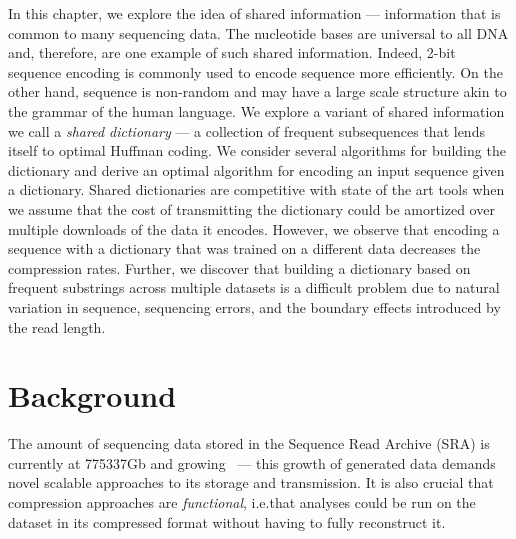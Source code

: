 \documentclass[12pt]{cmuthesis}
\begin{document}
In this chapter, we explore the idea of shared information --- information that is common to many sequencing data. The nucleotide bases are universal to all DNA and, therefore, are one example of such shared information. Indeed, 2-bit sequence encoding is commonly used to encode sequence more efficiently. On the other hand, sequence is non-random and may have a large scale structure akin to the grammar of the human language. We explore a variant of shared information we call a \textit{shared dictionary} --- a collection of frequent subsequences that lends itself to optimal Huffman coding. We consider several algorithms for building the dictionary and derive an optimal algorithm for encoding an input sequence given a dictionary. Shared dictionaries are competitive with state of the art tools when we assume that the cost of transmitting the dictionary could be amortized over multiple downloads of the data it encodes. However, we observe that encoding a sequence with a dictionary that was trained on a different data decreases the compression rates. Further, we discover that building a dictionary based on frequent substrings across multiple datasets is a difficult problem due to natural variation in sequence, sequencing errors, and the boundary effects introduced by the read length.



\section{Background}


The amount of sequencing data stored in the Sequence Read Archive (SRA) is currently at 775337Gb and growing~\cite{SRA} --- this growth of generated data demands novel scalable approaches to its storage and transmission. It is also crucial that compression approaches are \textit{functional}, i.e.\@ that analyses could be run on the dataset in its compressed format without having to fully reconstruct it. 
\end{document}
